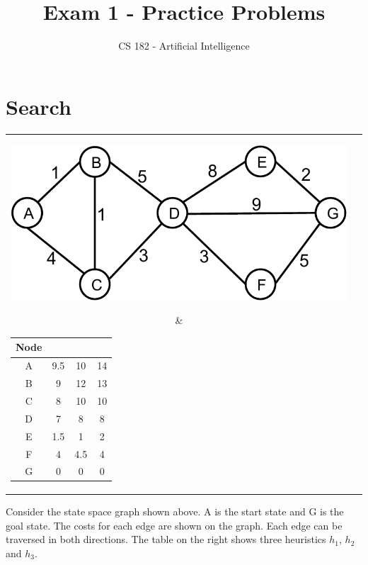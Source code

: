 \documentclass[a4paper]{article}
\title{Exam 1 - Practice Problems}
\author{CS 182 - Artificial Intelligence}
\begin{document}
\maketitle

\section{Search}

\begin{center}
\begin{tabular}{cc}
\parbox[c]{10cm}{\includegraphics[width =0.75\linewidth]{figs/search_graph.pdf} }
&
\begin{tabular}[h]{|c|c|c|c|}
\hline
Node &$h_1$ 	&	$h_2$ & $h_3$ \\
\hline
A 	& 	9.5 	&	10 & 14\\
B 	&	9	&	12	   & 13  \\
C 	&	8	&	10	   & 10   \\
D 	&	7	&	8	   & 8   \\
E 	&	1.5	&	1	   & 2 \\
F 	&	4	&	4.5	   & 4   \\
G 	&	0	&	0	   & 0   \\
\hline 
\end{tabular}
\end{tabular}
\end{center}

Consider the state space graph shown above.  A is the start state and
G is the goal state. The costs for each edge are shown on the graph.  Each edge can
be traversed in both directions. The table on the right shows three heuristics $h_1$, $h_2$ and $h_3$. 
\end{document}
